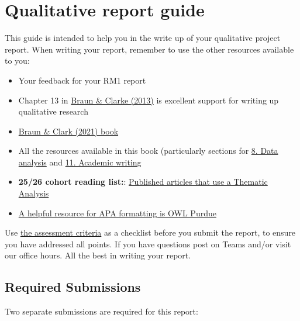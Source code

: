 \documentclass[
  english,
  letterpaper,
  DIV=11,
  numbers=noendperiod]{scrreprt}
\providecommand{\tightlist}{%
  \setlength{\itemsep}{0pt}\setlength{\parskip}{0pt}}
\begin{document}
\section{Qualitative report guide}\label{qual_report_guide}

This guide is intended to help you in the write up of your qualitative
project report. When writing your report, remember to use the other
resources available to you:

\begin{itemize}
\tightlist
\item
  Your feedback for your RM1 report
\item
  Chapter 13 in \href{https://go.exlibris.link/5g3nFfGx}{Braun \& Clarke
  (2013)} is excellent support for writing up qualitative research
\item
  \href{https://go.exlibris.link/Z9qxllzH}{Braun \& Clark (2021) book}
\item
  All the resources available in this book (particularly sections for
  \hyperref[ch8_data_analysis]{8. Data analysis} and
  \hyperref[c11_writing]{11. Academic writing}
\item
  \textbf{25/26 cohort reading list:}:
  \href{https://rl.talis.com/3/glasgow/lists/30BEDB96-5F9D-9F9E-630A-205B91FA34AB.html?lang=en-GB\#B226C8C1-1926-8328-A8A3-06DC389D9809}{Published
  articles that use a Thematic Analysis}
\item
  \href{https://owl.purdue.edu/owl/research_and_citation/apa_style/apa_formatting_and_style_guide/general_format.html}{A
  helpful resource for APA formatting is OWL Purdue}
\end{itemize}

Use \hyperref[ch4_AIS_report]{the assessment criteria} as a checklist
before you submit the report, to ensure you have addressed all points.
If you have questions post on Teams and/or visit our office hours. All
the best in writing your report.

\subsection{Required Submissions}\label{required-submissions}

Two separate submissions are required for this report:
\end{document}
